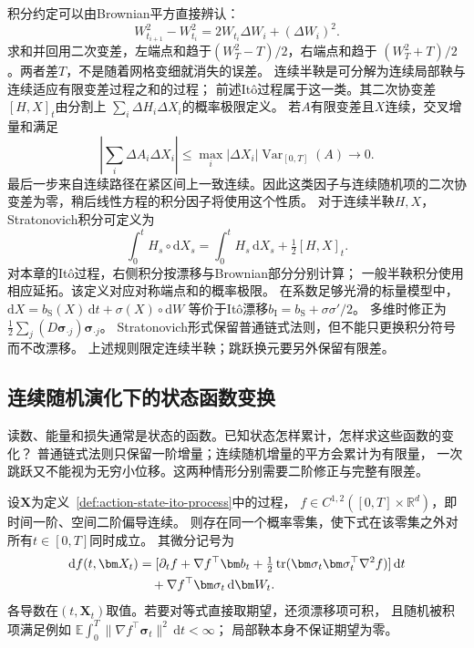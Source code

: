 积分约定可以由Brownian平方直接辨认：
\[
 W_{t_{i+1}}^2-W_{t_i}^2
     =2W_{t_i}\Delta W_i+(\Delta W_i)^2.
\]
求和并回用二次变差，左端点和趋于$(W_T^2-T)/2$，右端点和趋于
$(W_T^2+T)/2$。两者差$T$，不是随着网格变细就消失的误差。
连续半鞅是可分解为连续局部鞅与连续适应有限变差过程之和的过程；
前述Itô过程属于这一类。其二次协变差$[H,X]_t$由分割上
$\sum_i\Delta H_i\Delta X_i$的概率极限定义。
若$A$有限变差且$X$连续，交叉增量和满足
\[
 \left|\sum_i\Delta A_i\Delta X_i\right|
 \leq\max_i|\Delta X_i|\operatorname{Var}_{[0,T]}(A)
 \longrightarrow0.
\]
最后一步来自连续路径在紧区间上一致连续。因此这类因子与连续随机项的二次协变差为零，稍后线性方程的积分因子将使用这个性质。
对于连续半鞅$H,X$，
Stratonovich积分可定义为
\[
  \int_0^t H_s\circ\mathrm dX_s
       =\int_0^t H_s\,\mathrm dX_s+\tfrac12[H,X]_t.
\]
对本章的Itô过程，右侧积分按漂移与Brownian部分分别计算；
一般半鞅积分使用相应延拓。该定义对应对称端点和的概率极限。
在系数足够光滑的标量模型中，
$\mathrm dX=b_{\mathrm S}(X)\,\mathrm dt+\sigma(X)\circ\mathrm dW$
等价于Itô漂移$b_{\mathrm I}=b_{\mathrm S}+\sigma\sigma'/2$。
多维时修正为$\frac12\sum_j(D\bm\sigma_{\cdot j})\bm\sigma_{\cdot j}$。
Stratonovich形式保留普通链式法则，但不能只更换积分符号而不改漂移。
上述规则限定连续半鞅；跳跃换元要另外保留有限差。

\subsection{连续随机演化下的状态函数变换}
读数、能量和损失通常是状态的函数。已知状态怎样累计，怎样求这些函数的变化？
普通链式法则只保留一阶增量；连续随机增量的平方会累计为有限量，
一次跳跃又不能视为无穷小位移。这两种情形分别需要二阶修正与完整有限差。


\begin{theorem}[Itô公式]
  \label{thm:dynamical-ito-formula}
  设$\bm X$为定义~\ref{def:action-state-ito-process}中的过程，
  $f\in C^{1,2}([0,T]\times\mathbb R^d)$，即时间一阶、空间二阶偏导连续。
  则存在同一个概率零集，使下式在该零集之外对所有$t\in[0,T]$同时成立。
  其微分记号为
  \begin{align}
    \mathrm df(t,\bm X_t)
      &=[\partial_t f+\nabla f^\top\bm b_t
         +\tfrac12\operatorname{tr}
               (\bm\sigma_t\bm\sigma_t^\top\nabla^2 f)]\,\mathrm dt\notag\\
      &\quad+\nabla f^\top\bm\sigma_t\,\mathrm d\bm W_t.
    \label{eq:dynamical-ito-formula}
  \end{align}
  各导数在$(t,\bm X_t)$取值。若要对等式直接取期望，还须漂移项可积，
  且随机被积项满足例如
  $\mathbb E\int_0^T\|\nabla f^\top\bm\sigma_t\|^2\,\mathrm dt<\infty$；
  局部鞅本身不保证期望为零。
\end{theorem}

